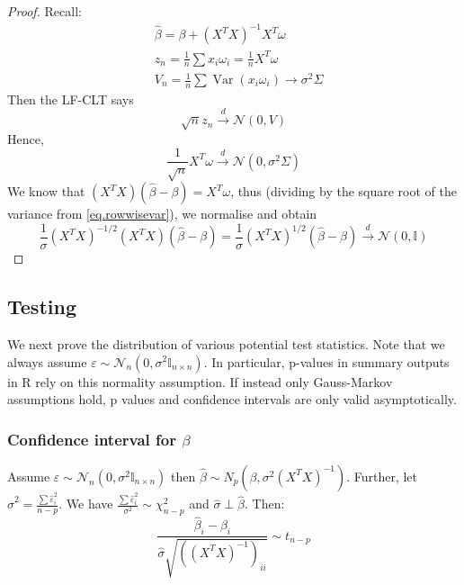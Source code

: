 \documentclass[11pt, %
	oneside, %
	english, %
	onehalfspacing, %
	]{article} %
\numberwithin{equation}{section}
\begin{document}
\begin{proof}
    Recall:
    $$
    \begin{aligned}
    & \hat{\beta}=\beta+ (X^TX)^{-1}  X^T \omega \\
    &  z_n=\frac{1}{n} \sum x_i \omega_i=\frac{1}{n} X^T \omega \\
    & V_n=\frac{1}{n} \sum \operatorname{Var}\left(x_i \omega_i\right) \rightarrow \sigma^2 \Sigma
    \end{aligned}
    $$
    Then the LF-CLT says
    $$
    \sqrt{ n } z_n \overset{d}{\to} \mathcal{N}(0,V)
    $$
    Hence,
    $$
    \frac{1}{\sqrt{ n }} X^T \omega \overset{d}{\to} \mathcal{N}(0,\sigma^2 \Sigma)
    $$
    We know that $(X^T X) (\hat{\beta}- \beta) = X^T \omega$, thus (dividing by the square root of the variance from \eqref{eq.rowwisevar}), we normalise and obtain
    $$
    \frac{1}{\sigma} (X^TX)^{-1/2} (X^T X) (\hat{\beta} - \beta) = \frac{1}{\sigma} (X^TX) ^{1/2}(\hat{\beta}- \beta) \overset{d}{\to} \mathcal{N}(0,\mathbb{I})
    $$
\end{proof}




\subsection{Testing}

We next prove the distribution of various potential test statistics. Note that we always assume $\varepsilon \sim \mathcal{N}_n(0, \sigma^2 \mathbb{I}_{n \times n})$. In particular, p-values in summary outputs in R rely on this normality assumption. If instead only Gauss-Markov assumptions hold, p values and confidence intervals are only valid asymptotically.

\subsubsection*{Confidence interval for $\beta$}

\begin{proposition}{}{}
    Assume $\varepsilon \sim \mathcal{N}_n(0, \sigma^2 \mathbb{I}_{n \times n})$ then $\hat{\beta} \sim N_p (\beta, \sigma^2 (X^TX)^{-1})$. Further, let $\hat{\sigma}^2 = \frac{\sum \hat{\varepsilon}_i^2}{n-p}$. We have $\frac{\sum \hat{\varepsilon}_i^2}{\sigma^2}  \sim \chi^2_{n-p}$ and $\hat{\sigma} \perp \hat{\beta}$. Then:
    $$
    \frac{\hat{\beta}_i - \beta_i}{\hat{\sigma} \sqrt{ \left( \left( X^T X \right)^{-1}   \right)_{ii}  }} \sim t_{n-p}
    $$
\end{proposition}
\end{document}
